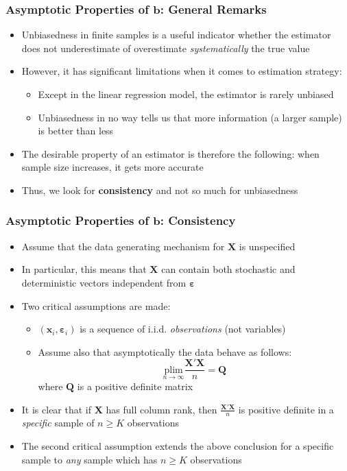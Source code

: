 \documentclass[10pt]{beamer}
\newcommand{\plim}{\mathrm{plim}}
\theoremstyle{definition}
\begin{document}
\begin{frame}[fragile]
\frametitle{Asymptotic Properties of $ \mathbf{b} $: General Remarks}
\begin{itemize}
	\item Unbiasedness in finite samples is a useful indicator whether the estimator does not underestimate of overestimate \textit{systematically} the true value
	\item However, it has significant limitations when it comes to estimation strategy:
	\begin{itemize}
		\item Except in the linear regression model, the estimator is rarely unbiased
		\item Unbiasedness in no way tells us that more information (a larger sample) is better than less
	\end{itemize}
	\item The desirable property of an estimator is therefore the following: when sample size increases, it gets more accurate
	\item Thus, we look for \textbf{consistency} and not so much for unbiasedness
\end{itemize}	
\end{frame}

\begin{frame}[fragile]
\frametitle{Asymptotic Properties of $\mathbf{b}$: Consistency}
\begin{itemize}
	\item Assume that the data generating mechanism for $\mathbf{X}$ is unspecified
	\item In particular, this means that $ \mathbf{X} $ can contain both stochastic and deterministic vectors independent from $ \boldsymbol\varepsilon $
	\item Two critical assumptions are made:
	\begin{itemize}
		\item $ (\mathbf{x}_{i}, \boldsymbol\varepsilon_{i}) $ is a sequence of i.i.d. \textit{observations} (not variables)
			\item Assume also that asymptotically the data behave as follows:
		\[
		\underset{n\to\infty}{\plim}\frac{\mathbf{X'X}}{n} = \mathbf{Q}
		\]
		where $\mathbf{Q}$ is a positive definite matrix
	\end{itemize}

	\item It is clear that if $ \mathbf{X} $ has full column rank, then $ \frac{\mathbf{X'X}}{n} $ is positive definite in a \textit{specific} sample of $ n \geq K $ observations
	\item The second critical assumption extends the above conclusion for a specific sample to \textit{any} sample which has $ n \geq K $ observations
\end{itemize}
\end{frame}
\end{document}
